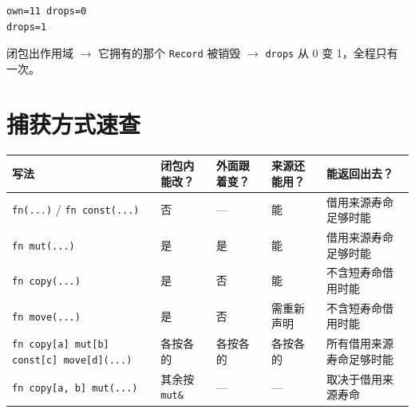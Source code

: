 \par
\medskip
\begin{lstlisting}[style=out]
own=11 drops=0
drops=1
\end{lstlisting}
\par
\medskip

闭包出作用域 \ensuremath{\rightarrow} 它拥有的那个 \texttt{Record} 被销毁 \ensuremath{\rightarrow} \texttt{drops} 从 0 变 1，全程只有一次。

\section{捕获方式速查}

{\small\setlength{\tabcolsep}{4pt}
\begin{longtable}{>{\raggedright\arraybackslash}p{}>{\raggedright\arraybackslash}p{}>{\raggedright\arraybackslash}p{}>{\raggedright\arraybackslash}p{}>{\raggedright\arraybackslash}p{}}
\toprule
写法 & 闭包内能改？ & 外面跟着变？ & 来源还能用？ & 能返回出去？ \\
\midrule
\endhead
\texttt{fn(\allowbreak{}.\allowbreak{}.\allowbreak{}.\allowbreak{})\allowbreak{}} / \texttt{fn const(\allowbreak{}.\allowbreak{}.\allowbreak{}.\allowbreak{})\allowbreak{}} & 否 & — & 能 & 借用来源寿命足够时能 \\
\texttt{fn mut(\allowbreak{}.\allowbreak{}.\allowbreak{}.\allowbreak{})\allowbreak{}} & 是 & 是 & 能 & 借用来源寿命足够时能 \\
\texttt{fn copy(\allowbreak{}.\allowbreak{}.\allowbreak{}.\allowbreak{})\allowbreak{}} & 是 & 否 & 能 & 不含短寿命借用时能 \\
\texttt{fn move(\allowbreak{}.\allowbreak{}.\allowbreak{}.\allowbreak{})\allowbreak{}} & 是 & 否 & 需重新声明 & 不含短寿命借用时能 \\
\texttt{fn copy[\allowbreak{}a]\allowbreak{} mut[\allowbreak{}b]\allowbreak{} const[\allowbreak{}c]\allowbreak{} move[\allowbreak{}d]\allowbreak{}(\allowbreak{}.\allowbreak{}.\allowbreak{}.\allowbreak{})\allowbreak{}} & 各按各的 & 各按各的 & 各按各的 & 所有借用来源寿命足够时能 \\
\texttt{fn copy[\allowbreak{}a,\allowbreak{} b]\allowbreak{} mut(\allowbreak{}.\allowbreak{}.\allowbreak{}.\allowbreak{})\allowbreak{}} & 其余按 \texttt{mut\&} & — & — & 取决于借用来源寿命 \\
\bottomrule
\end{longtable}
}

